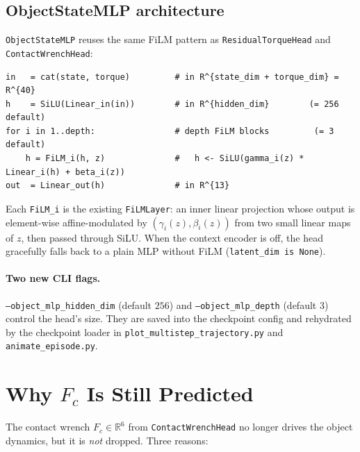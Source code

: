 \documentclass[11pt]{article}
\begin{document}
\subsection{ObjectStateMLP architecture}

\texttt{ObjectStateMLP} reuses the same FiLM pattern as
\texttt{ResidualTorqueHead} and \texttt{ContactWrenchHead}:
\begin{lstlisting}
in   = cat(state, torque)         # in R^{state_dim + torque_dim} = R^{40}
h    = SiLU(Linear_in(in))        # in R^{hidden_dim}        (= 256 default)
for i in 1..depth:                # depth FiLM blocks         (= 3 default)
    h = FiLM_i(h, z)              #   h <- SiLU(gamma_i(z) * Linear_i(h) + beta_i(z))
out  = Linear_out(h)              # in R^{13}
\end{lstlisting}
Each \texttt{FiLM\_i} is the existing \texttt{FiLMLayer}: an inner
linear projection whose output is element-wise affine-modulated by
\((\gamma_i(z), \beta_i(z))\) from two small linear maps of $z$, then
passed through SiLU.  When the context encoder is off, the head
gracefully falls back to a plain MLP without FiLM
(\texttt{latent\_dim is None}).

\paragraph{Two new CLI flags.}
\texttt{--object\_mlp\_hidden\_dim} (default $256$) and
\texttt{--object\_mlp\_depth} (default $3$) control the head's size.
They are saved into the checkpoint config and rehydrated by the
checkpoint loader in \texttt{plot\_multistep\_trajectory.py} and
\texttt{animate\_episode.py}.

\section{Why $F_c$ Is Still Predicted}

The contact wrench $F_c \in \mathbb{R}^6$ from
\texttt{ContactWrenchHead} no longer drives the object dynamics, but
it is \emph{not} dropped.  Three reasons:
\end{document}
